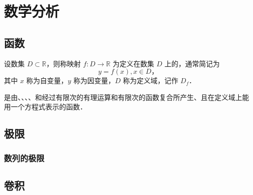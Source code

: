 \chapter{数学分析}

\section{函数}

\begin{Definition}\label{Definition:Function}
    设数集 $ D \subset \mathbb{R} $，则称映射 $ f: D \to \mathbb{R} $ 为定义在数集 $D$ 上的，通常简记为
    \[ y = f(x), x \in D \text{，} \]
    其中 $x$ 称为自变量，$y$ 称为因变量，$D$ 称为定义域，记作 $D_f$．
\end{Definition}

\begin{Definition}\label{Definition:ElementaryFunction}
    是由、、、、和经过有限次的有理运算和有限次的函数复合所产生、且在定义域上能用一个方程式表示的函数．
\end{Definition}

\section{极限}

\subsection{数列的极限}

\section{卷积}

